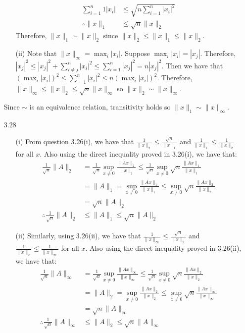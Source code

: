 \documentclass[letterpaper,12pt]{article}
\theoremstyle{definition}
\begin{document}
\begin{enumerate}
\begin{enumerate}
\begin{align*}
                \sum_{i=1}^n 1|x_i| & \leq \sqrt{n \sum_{i=1}^n |x_i|^2} \\
                \therefore \|x\|_1 & \leq \sqrt{n}\|x\|_2
              \end{align*}
              Therefore, $\|x\|_1 \sim \|x\|_2$ since $\|x\|_2 \leq \|x\|_1 \leq \|x\|_2$.
            \item[(ii)]
            Note that $\|x\|_\infty = \max_i |x_i|$. Suppose $\max_i |x_i| = |x_j|$. Therefore, $|x_j|^2 \leq |x_j|^2+\sum_{i \neq j}^n |x_i|^2 \leq \sum_{i=1}^n |x_j|^2 = n|x_j|^2$. Then we have that $ (\max_i |x_i|)^2 \leq \sum_{ =1}^n |x_i|^2 \leq n(\max_i |x_i|)^2$. Therefore, $\|x\|_\infty \leq \|x\|_2 \leq \sqrt{n}\|x\|_\infty$ so $\|x\|_2 \sim \|x\|_\infty$.
          \end{enumerate}
          Since $\sim$ is an equivalence relation, transitivity holds so $\|x\|_1 \sim \|x\|_\infty$.

        \item[3.28]
          \begin{enumerate}
            \item[(i)]
            From question 3.26(i), we have that $\frac{1}{\|x\|_2} \leq \frac{\sqrt{n}}{\|x\|_1}$ and $\frac{1}{\|x\|_1} \leq \frac{1}{\|x\|_2}$ for all $x$. Also using the direct inequality proved in 3.26(i), we have that:
            \begin{align*}
              \frac{1}{\sqrt{n}}\|A\|_2 &= \frac{1}{\sqrt{n}} \sup_{x\neq0} \frac{\|Ax\|_2}{\|x\|_2} \leq \frac{1}{\sqrt{n}} \sup_{x\neq0} \sqrt{n}\frac{\|Ax\|_1}{\|x\|_1} \\
              &= \|A\|_1 = \sup_{x\neq0} \frac{\|Ax\|_1}{\|x\|_1} \leq \sup_{x\neq0} \sqrt{n}\frac{\|Ax\|_2}{\|x\|_2} \\
              &= \sqrt{n}\|A\|_2 \\
              \therefore \frac{1}{\sqrt{n}}\|A\|_2 & \leq \|A\|_1 \leq\sqrt{n}\|A\|_2
            \end{align*}
            \item[(ii)]
            Similarly, using 3.26(ii), we have that $\frac{1}{\|x\|_\infty} \leq \frac{\sqrt{n}}{\|x\|_2}$ and $\frac{1}{\|x\|_2} \leq \frac{1}{\|x\|_\infty}$ for all $x$. Also using the direct inequality proved in 3.26(ii), we have that:
            \begin{align*}
              \frac{1}{\sqrt{n}}\|A\|_\infty &= \frac{1}{\sqrt{n}} \sup_{x\neq0} \frac{\|Ax\|_\infty}{\|x\|_\infty} \leq \frac{1}{\sqrt{n}} \sup_{x\neq0} \sqrt{n}\frac{\|Ax\|_2}{\|x\|_2} \\
              &= \|A\|_2 = \sup_{x\neq0} \frac{\|Ax\|_2}{\|x\|_2} \leq \sup_{x\neq0} \sqrt{n}\frac{\|Ax\|_\infty}{\|x\|_\infty} \\
              &= \sqrt{n}\|A\|_\infty \\
              \therefore \frac{1}{\sqrt{n}}\|A\|_\infty & \leq \|A\|_2 \leq\sqrt{n}\|A\|_\infty
            \end{align*}
          \end{enumerate}


\end{enumerate}
\end{document}
